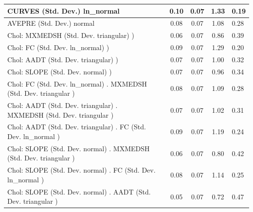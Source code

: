 \begin{table}
\begin{center}
\begin{tabular}{|l|l|c|c|c|l|}
			\hline
			CURVES (Std. Dev.) ln_normal &  & 0.10 & 0.07 & 1.33 & 0.19 \\
			\hline
			AVEPRE (Std. Dev.) normal &  & 0.08 & 0.07 & 1.08 & 0.28 \\
			\hline
			 Chol: MXMEDSH (Std. Dev. triangular) ) &  & 0.06 & 0.07 & 0.86 & 0.39 \\
			\hline
			 Chol: FC (Std. Dev. ln_normal) ) &  & 0.09 & 0.07 & 1.29 & 0.20 \\
			\hline
			 Chol: AADT (Std. Dev. triangular) ) &  & 0.07 & 0.07 & 1.00 & 0.32 \\
			\hline
			 Chol: SLOPE (Std. Dev. normal) ) &  & 0.07 & 0.07 & 0.96 & 0.34 \\
			\hline
			 Chol: FC (Std. Dev. ln_normal) . MXMEDSH (Std. Dev.   triangular ) &  & 0.08 & 0.07 & 1.09 & 0.28 \\
			\hline
			 Chol: AADT (Std. Dev. triangular) . MXMEDSH (Std. Dev.   triangular ) &  & 0.07 & 0.07 & 1.02 & 0.31 \\
			\hline
			 Chol: AADT (Std. Dev. triangular) . FC (Std. Dev.   ln_normal ) &  & 0.09 & 0.07 & 1.19 & 0.24 \\
			\hline
			 Chol: SLOPE (Std. Dev. normal) . MXMEDSH (Std. Dev.   triangular ) &  & 0.06 & 0.07 & 0.80 & 0.42 \\
			\hline
			 Chol: SLOPE (Std. Dev. normal) . FC (Std. Dev.   ln_normal ) &  & 0.08 & 0.07 & 1.14 & 0.25 \\
			\hline
			 Chol: SLOPE (Std. Dev. normal) . AADT (Std. Dev.   triangular ) &  & 0.05 & 0.07 & 0.72 & 0.47 \\
			\hline
		\end{tabular}
	\end{center}
\end{table}